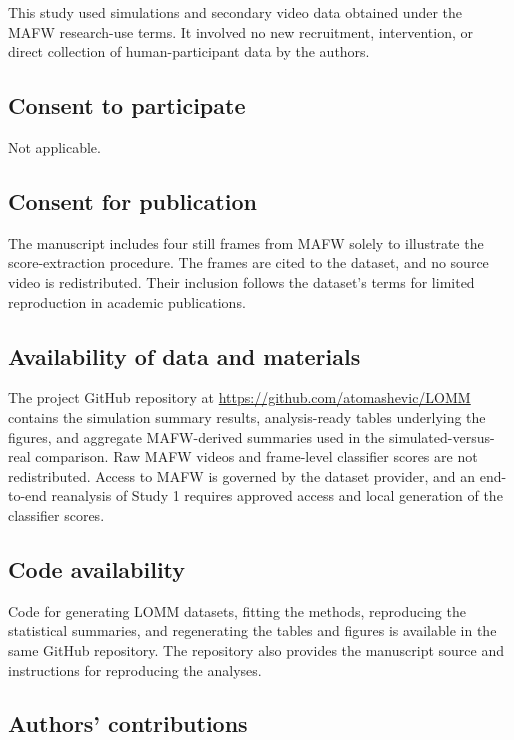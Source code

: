 \documentclass[
]{article}
\begin{document}
This study used simulations and secondary video data obtained under the
MAFW research-use terms. It involved no new recruitment, intervention,
or direct collection of human-participant data by the authors.

\subsection{Consent to participate}\label{consent-to-participate}

Not applicable.

\subsection{Consent for publication}\label{consent-for-publication}

The manuscript includes four still frames from MAFW solely to illustrate
the score-extraction procedure. The frames are cited to the dataset, and
no source video is redistributed. Their inclusion follows the dataset's
terms for limited reproduction in academic publications.

\subsection{Availability of data and
materials}\label{availability-of-data-and-materials}

The project GitHub repository at
\url{https://github.com/atomashevic/LOMM} contains the simulation
summary results, analysis-ready tables underlying the figures, and
aggregate MAFW-derived summaries used in the simulated-versus-real
comparison. Raw MAFW videos and frame-level classifier scores are not
redistributed. Access to MAFW is governed by the dataset provider, and
an end-to-end reanalysis of Study 1 requires approved access and local
generation of the classifier scores.

\subsection{Code availability}\label{code-availability}

Code for generating LOMM datasets, fitting the methods, reproducing the
statistical summaries, and regenerating the tables and figures is
available in the same GitHub repository. The repository also provides
the manuscript source and instructions for reproducing the analyses.

\subsection{Authors' contributions}\label{authors-contributions}
\end{document}
